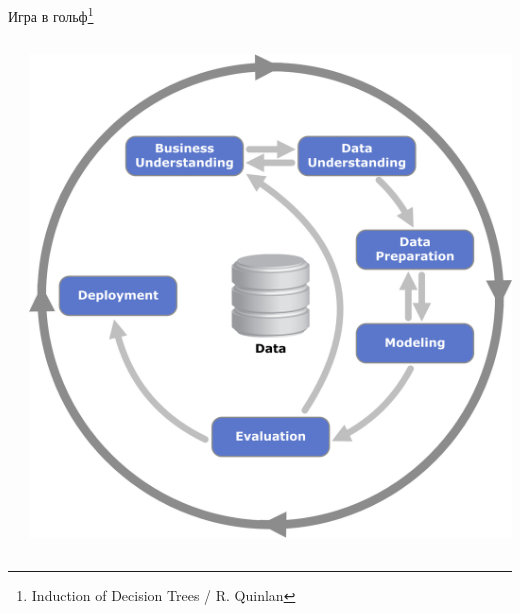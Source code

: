 \documentclass[aspectratio=169]{beamer}
\begin{document}
\begin{frame}{Игра в гольф\footnote{Induction of Decision Trees / R. Quinlan}}
\begin{columns}
\begin{column}{.7\linewidth}
    \end{column}
    \begin{column}{.3\linewidth}
    \vspace{-0em}
		\begin{center}
   		\includegraphics[width=\textwidth]{images/crisp.png}
    \end{center}
    \end{column}
  \end{columns}

\end{frame}
\end{document}
